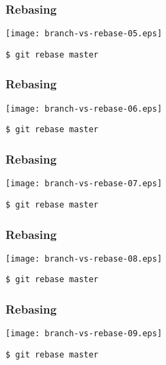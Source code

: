 \documentclass[english]{beamer}
\newcommand{\CMD}[1]{%
\texttt{\textcolor{code-blue}{#1}}%
}
\begin{document}
\begin{frame}
\frametitle{Rebasing}

\texttt{[image: branch-vs-rebase-05.eps]}
\vspace{\baselineskip}
\begin{flushright}
        \CMD{\$ git rebase master}
\end{flushright}
\vspace{\textheight}
\end{frame}

\begin{frame}
\frametitle{Rebasing}

\texttt{[image: branch-vs-rebase-06.eps]}
\vspace{\baselineskip}
\begin{flushright}
        \CMD{\$ git rebase master}
\end{flushright}
\vspace{\textheight}
\end{frame}

\begin{frame}
\frametitle{Rebasing}

\texttt{[image: branch-vs-rebase-07.eps]}
\vspace{\baselineskip}
\begin{flushright}
        \CMD{\$ git rebase master}
\end{flushright}
\vspace{\textheight}
\end{frame}

\begin{frame}
\frametitle{Rebasing}

\texttt{[image: branch-vs-rebase-08.eps]}
\vspace{\baselineskip}
\begin{flushright}
        \CMD{\$ git rebase master}
\end{flushright}
\vspace{\textheight}
\end{frame}

\begin{frame}
\frametitle{Rebasing}

\texttt{[image: branch-vs-rebase-09.eps]}
\vspace{\baselineskip}
\begin{flushright}
        \CMD{\$ git rebase master}
\end{flushright}
\vspace{\textheight}
\end{frame}
\end{document}
